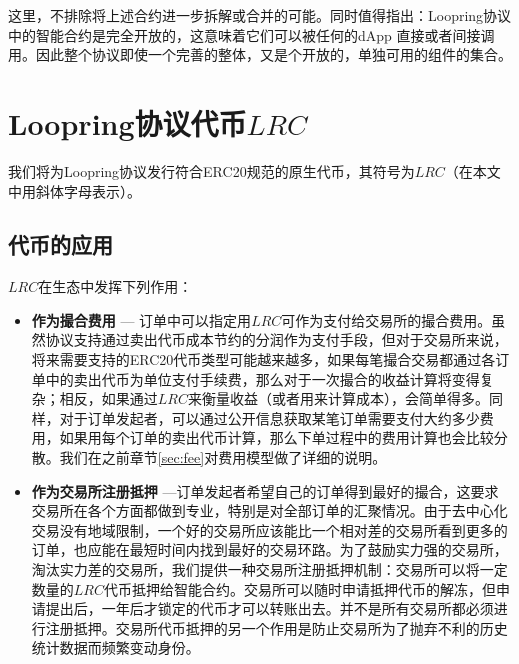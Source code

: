 \documentclass[UTF8,nofonts]{ctexart}
\begin{document}
这里，不排除将上述合约进一步拆解或合并的可能。同时值得指出：Loopring协议中的智能合约是完全开放的，这意味着它们可以被任何的dApp 直接或者间接调用。因此整个协议即使一个完善的整体，又是个开放的，单独可用的组件的集合。

\section{Loopring协议代币$LRC$\label{sec:protocoltoken}}


我们将为Loopring协议发行符合ERC20规范的原生代币，其符号为$LRC$（在本文中用斜体字母表示）。


\subsection{代币的应用}

$LRC$在生态中发挥下列作用：

\begin{itemize}
  \item \textbf{作为撮合费用} --- 订单中可以指定用$LRC$可作为支付给交易所的撮合费用。虽然协议支持通过卖出代币成本节约的分润作为支付手段，但对于交易所来说，将来需要支持的ERC20代币类型可能越来越多，如果每笔撮合交易都通过各订单中的卖出代币为单位支付手续费，那么对于一次撮合的收益计算将变得复杂；相反，如果通过$LRC$来衡量收益（或者用来计算成本），会简单得多。同样，对于订单发起者，可以通过公开信息获取某笔订单需要支付大约多少费用，如果用每个订单的卖出代币计算，那么下单过程中的费用计算也会比较分散。我们在之前章节\ref{sec:fee}对费用模型做了详细的说明。
  \item \textbf{作为交易所注册抵押} ---订单发起者希望自己的订单得到最好的撮合，这要求交易所在各个方面都做到专业，特别是对全部订单的汇聚情况。由于去中心化交易没有地域限制，一个好的交易所应该能比一个相对差的交易所看到更多的订单，也应能在最短时间内找到最好的交易环路。为了鼓励实力强的交易所，淘汰实力差的交易所，我们提供一种交易所注册抵押机制：交易所可以将一定数量的$LRC$代币抵押给智能合约。交易所可以随时申请抵押代币的解冻，但申请提出后，一年后才锁定的代币才可以转账出去。并不是所有交易所都必须进行注册抵押。交易所代币抵押的另一个作用是防止交易所为了抛弃不利的历史统计数据而频繁变动身份。
\end{itemize}
\end{document}
